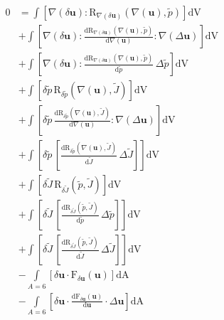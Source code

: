 \documentclass[preview,varwidth,multi,border=1pt]{standalone}
\begin{document}
\preview
$\begin{aligned}
0 &= \int\left[\nabla\left(\delta{\mathbf{u}}\right) \colon {\mathrm{R}}_{\nabla\left(\delta{\mathbf{u}}\right)}\left(\nabla\left({\mathbf{u}}\right), {\tilde{p}}\right)\right]\textrm{dV} \\
  &+ \int\left[\nabla\left(\delta{\mathbf{u}}\right) \colon \frac{\mathrm{d}{\mathrm{R}}_{\nabla\left(\delta{\mathbf{u}}\right)}\left(\nabla\left({\mathbf{u}}\right), {\tilde{p}}\right)}{\mathrm{d}\nabla\left({\mathbf{u}}\right)} \colon \nabla\left(\Delta{\mathbf{u}}\right)\right]\textrm{dV}  \\
  &+ \int\left[\nabla\left(\delta{\mathbf{u}}\right) \colon \frac{\mathrm{d}{\mathrm{R}}_{\nabla\left(\delta{\mathbf{u}}\right)}\left(\nabla\left({\mathbf{u}}\right), {\tilde{p}}\right)}{\mathrm{d}{\tilde{p}}}\,\Delta{\tilde{p}}\right]\textrm{dV}  \\
  &+ \int\left[\delta{\tilde{p}}\,{\mathrm{R}}_{\delta{\tilde{p}}}\left(\nabla\left({\mathbf{u}}\right), {\tilde{J}}\right)\right]\textrm{dV}  \\
  &+ \int\left[\delta{\tilde{p}}\,\frac{\mathrm{d}{\mathrm{R}}_{\delta{\tilde{p}}}\left(\nabla\left({\mathbf{u}}\right), {\tilde{J}}\right)}{\mathrm{d}\nabla\left({\mathbf{u}}\right)} \colon \nabla\left(\Delta{\mathbf{u}}\right)\right]\textrm{dV}  \\
  &+ \int\left[\delta{\tilde{p}}\,\left[\frac{\mathrm{d}{\mathrm{R}}_{\delta{\tilde{p}}}\left(\nabla\left({\mathbf{u}}\right), {\tilde{J}}\right)}{\mathrm{d}{\tilde{J}}}\,\Delta{\tilde{J}}\right]\right]\textrm{dV}  \\
  &+ \int\left[\delta{\tilde{J}}\,{\mathrm{R}}_{\delta{\tilde{J}}}\left({\tilde{p}}, {\tilde{J}}\right)\right]\textrm{dV}  \\
  &+ \int\left[\delta{\tilde{J}}\,\left[\frac{\mathrm{d}{\mathrm{R}}_{\delta{\tilde{J}}}\left({\tilde{p}}, {\tilde{J}}\right)}{\mathrm{d}{\tilde{p}}}\,\Delta{\tilde{p}}\right]\right]\textrm{dV}  \\
  &+ \int\left[\delta{\tilde{J}}\,\left[\frac{\mathrm{d}{\mathrm{R}}_{\delta{\tilde{J}}}\left({\tilde{p}}, {\tilde{J}}\right)}{\mathrm{d}{\tilde{J}}}\,\Delta{\tilde{J}}\right]\right]\textrm{dV}  \\
  &- \int\limits_{A=6}\left[\delta{\mathbf{u}} \cdot {\mathrm{F}}_{\delta{\mathbf{u}}}\left({\mathbf{u}}\right)\right]\textrm{dA}  \\
  &- \int\limits_{A=6}\left[\delta{\mathbf{u}} \cdot \frac{\mathrm{d}{\mathrm{F}}_{\delta{\mathbf{u}}}\left({\mathbf{u}}\right)}{\mathrm{d}{\mathbf{u}}} \cdot \Delta{\mathbf{u}}\right]\textrm{dA}
\end{aligned}$
\endpreview
\end{document}
